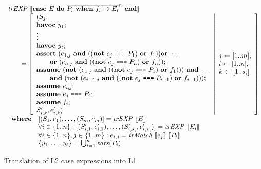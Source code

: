 \begin{figure}
\[
\begin{array}{l}
\mathit{trEXP}~\llbracket\textbf{case}~E~\textbf{do}~\overline{P_i~\textbf{when}~f_i \rightarrow E_i}^n~\textbf{end}\rrbracket\\
\qquad = \left[ \begin{array}{l}
(S_j;\\
\textbf{havoc}~y_{1};\\
\vdots\\
\textbf{havoc}~y_{t};\\
\textbf{assert}~(e_{1,j}~\textbf{and}~((\textbf{not}~e_j~\texttt{===}~P_1)~\textbf{or}~f_1))\textbf{or}~\cdots\\
\quad\quad\textbf{or}~(e_{n,j}~\textbf{and}~((\textbf{not}~e_j~\texttt{===}~P_n)~\textbf{or}~f_n)); \\
\textbf{assume}~(\textbf{not}~(e_{1,j}~\textbf{and}~((\textbf{not}~e_j~\texttt{===}~P_1)~\textbf{or}~f_1)))~\textbf{and}~\cdots\\
\quad\quad\textbf{and}~(\textbf{not}~(e_{i-1,j}~\textbf{and}~((\textbf{not}~e_j~\texttt{===}~P_{i - 1})~\textbf{or}~f_{i - 1}))); \\
\textbf{assume}~e_{i,j};\\
\textbf{assume}~e_j~\texttt{===}~P_i;\\
\textbf{assume}~f_{i};\\
S_{i,k}', e_{i,k}')
\end{array}  \middle\vert
\begin{array}{l}
j \leftarrow [1..m], \\
i \leftarrow [1..n], \\
k \leftarrow [1..s_i] \\
\end{array}
\right]\\
\begin{array}{ll}
\textbf{where} & [(S_1,e_1),\ldots,(S_m,e_m)] = \mathit{trEXP}~\llbracket E\rrbracket \\
& \forall i \in \{1..n\}: [(S'_{i,1},e'_{i,1}),\ldots,(S'_{i,s_i},e'_{i,s_i})] = \mathit{trEXP}~\llbracket E_i\rrbracket \\
& \forall i \in \{1..n\}, j \in \{1..m\}: e_{i,j} = \mathit{trMatch}~\llbracket e_j\rrbracket~\llbracket P_i\rrbracket \\
& \{y_{1}, \ldots, y_{t}\} = \bigcup_{i = 1}^n\mathit{vars}(P_i) \\
\end{array}
\end{array}
\]
\caption{Translation of L2 case expressions into L1}
\label{fig:casetr}
\end{figure}

